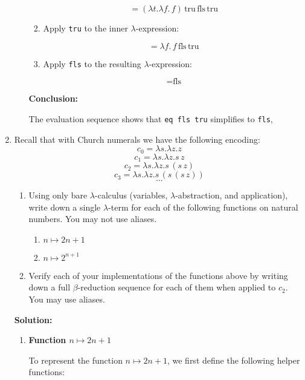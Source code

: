 \documentclass{article}
\begin{document}
\begin{enumerate}
\begin{enumerate}
\begin{enumerate}
\[
= (\lambda t. \lambda f. \, f) \, \text{tru} \, \text{fls} \, \text{tru}
\]

        \item Apply \texttt{tru} to the inner $\lambda$-expression:

\[
= \lambda f. \, f \, \text{fls} \, \text{tru}
\]

        \item Apply \texttt{fls} to the resulting $\lambda$-expression:

\[
= \text{fls}
\]
    \end{enumerate}

\noindent
\textbf{Conclusion:}

\noindent
The evaluation sequence shows that \texttt{eq fls tru} simplifies to \texttt{fls},
    
    \end{enumerate}
    
    \item Recall that with Church numerals we have the following encoding:
    \[
    c_0 = \lambda s.\lambda z.z
    \]
    \[
    c_1 = \lambda s.\lambda z.s \, z
    \]
    \[
    c_2 = \lambda s.\lambda z.s \, (s \, z)
    \]
    \[
    c_3 = \lambda s.\lambda z.s \, (s \, (s \, z))
    \]
    \[
    \dots
    \]
    
    \begin{enumerate}
        \item Using only bare $\lambda$-calculus (variables, $\lambda$-abstraction, and application), write down a single $\lambda$-term for each of the following functions on natural numbers. You may not use aliases.
        \begin{enumerate}
            \item $n \mapsto 2n + 1$
            \item $n \mapsto 2^{n+1}$
        \end{enumerate}
        \item Verify each of your implementations of the functions above by writing down a full $\beta$-reduction sequence for each of them when applied to $c_2$. You may use aliases.
    \end{enumerate}

    \textbf{Solution:}
    \begin{enumerate}
        \item \textbf{Function $n \mapsto 2n + 1$}

        To represent the function \( n \mapsto 2n + 1 \), we first define the following helper functions:
        

\end{enumerate}
\end{enumerate}
\end{document}
